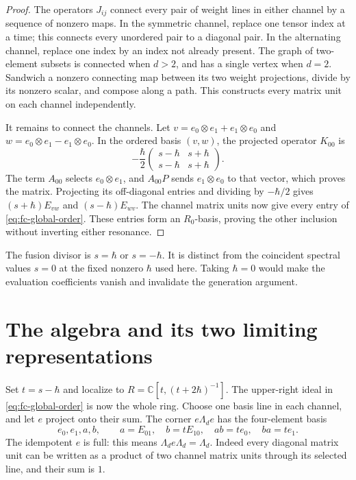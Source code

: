 \begin{proof}
The operators \(J_{ij}\) connect every pair of weight lines in either
channel by a sequence of nonzero maps. In the symmetric channel, replace
one tensor index at a time; this connects every unordered pair to a
diagonal pair. In the alternating channel, replace one index by an index
not already present. The graph of two-element subsets is connected when
\(d>2\), and has a single vertex when \(d=2\).
Sandwich a nonzero connecting map between its two weight projections,
divide by its nonzero scalar, and compose along a path. This constructs
every matrix unit on each channel independently.

It remains to connect the channels. Let
\(v=e_0\otimes e_1+e_1\otimes e_0\) and
\(w=e_0\otimes e_1-e_1\otimes e_0\). In the ordered basis \((v,w)\),
the projected operator \(K_{00}\) is
\[
 -\frac{\hbar}{2}
 \begin{pmatrix}s-\hbar&s+\hbar\\s-\hbar&s+\hbar\end{pmatrix}.
\]
The term \(A_{00}\) selects \(e_0\otimes e_1\), and
\(A_{00}P\) sends \(e_1\otimes e_0\) to that vector, which proves the
matrix. Projecting its off-diagonal entries and dividing by
\(-\hbar/2\) gives \((s+\hbar)E_{vw}\) and
\((s-\hbar)E_{wv}\). The channel matrix units now give every entry of
\eqref{eq:fc-global-order}. These entries form an \(R_0\)-basis, proving
the other inclusion without inverting either resonance.
\end{proof}

The fusion divisor is \(s=\hbar\) or \(s=-\hbar\). It is distinct
from the coincident spectral values \(s=0\) at the fixed nonzero
\(\hbar\) used here. Taking \(\hbar=0\) would make the evaluation
coefficients vanish and invalidate the generation argument.

\section{The algebra and its two limiting representations}

Set \(t=s-\hbar\) and localize to
\(R=\mathbb C[t,(t+2\hbar)^{-1}]\). The upper-right ideal in
\eqref{eq:fc-global-order} is now the whole ring. Choose one basis line
in each channel, and let \(e\) project onto their sum. The corner
\(e\Lambda_de\) has the four-element basis
\[
 e_0,e_1,a,b,\qquad a=E_{01},\quad b=tE_{10},\quad
 ab=te_0,\quad ba=te_1.
\]
The idempotent \(e\) is full: this means \(\Lambda_de\Lambda_d=\Lambda_d\).
Indeed every diagonal matrix unit can be written as a product of two
channel matrix units through its selected line, and their sum is \(1\).

